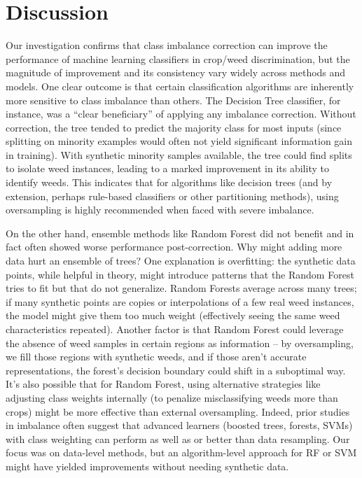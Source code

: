 \documentclass[agriengineering,article,submit,pdftex,moreauthors]{Definitions/mdpi}
\begin{document}
\section{Discussion}
\label{section:discussion}
Our investigation confirms that class imbalance correction can improve the performance of machine learning classifiers in crop/weed discrimination, but the magnitude of improvement and its consistency vary widely across methods and models. One clear outcome is that certain classification algorithms are inherently more sensitive to class imbalance than others. The Decision Tree classifier, for instance, was a “clear beneficiary” of applying any imbalance correction. Without correction, the tree tended to predict the majority class for most inputs (since splitting on minority examples would often not yield significant information gain in training). With synthetic minority samples available, the tree could find splits to isolate weed instances, leading to a marked improvement in its ability to identify weeds. This indicates that for algorithms like decision trees (and by extension, perhaps rule-based classifiers or other partitioning methods), using oversampling is highly recommended when faced with severe imbalance.

On the other hand, ensemble methods like Random Forest did not benefit and in fact often showed worse performance post-correction. Why might adding more data hurt an ensemble of trees? One explanation is overfitting: the synthetic data points, while helpful in theory, might introduce patterns that the Random Forest tries to fit but that do not generalize. Random Forests average across many trees; if many synthetic points are copies or interpolations of a few real weed instances, the model might give them too much weight (effectively seeing the same weed characteristics repeated). Another factor is that Random Forest could leverage the absence of weed samples in certain regions as information – by oversampling, we fill those regions with synthetic weeds, and if those aren’t accurate representations, the forest’s decision boundary could shift in a suboptimal way. It’s also possible that for Random Forest, using alternative strategies like adjusting class weights internally (to penalize misclassifying weeds more than crops) might be more effective than external oversampling. Indeed, prior studies in imbalance often suggest that advanced learners (boosted trees, forests, SVMs) with class weighting can perform as well as or better than data resampling. Our focus was on data-level methods, but an algorithm-level approach for RF or SVM might have yielded improvements without needing synthetic data.
\end{document}
